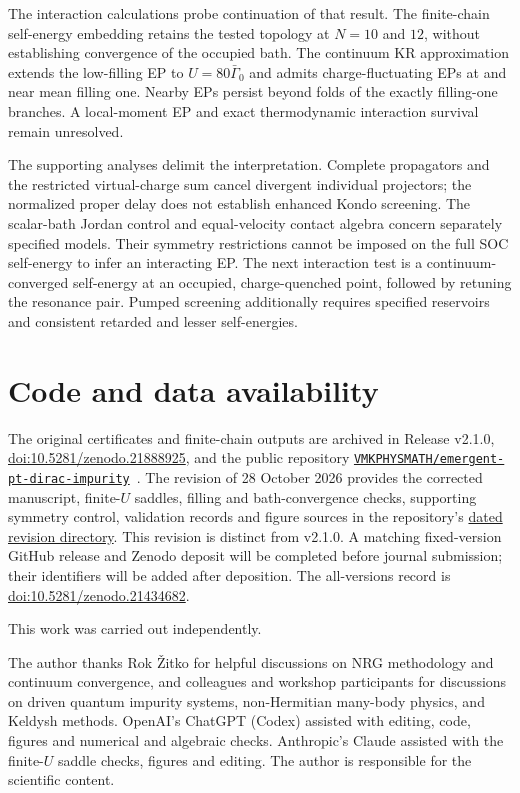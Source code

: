 \documentclass[%
  aps,physrev,onecolumn,10pt,amsmath,amssymb,superscriptaddress,longbibliography,floatfix
]{revtex4-2}
\begin{document}
The interaction calculations probe continuation of that result. The
finite-chain self-energy embedding retains the tested topology at $N=10$
and $12$, without establishing convergence of the occupied bath. The
continuum KR approximation extends the low-filling EP to
$U=80\bar\Gamma_0$ and admits charge-fluctuating EPs at and near mean
filling one. Nearby EPs persist beyond folds of the exactly filling-one
branches. A local-moment EP and exact thermodynamic interaction survival
remain unresolved.

The supporting analyses delimit the interpretation. Complete propagators
and the restricted virtual-charge sum cancel divergent individual
projectors; the normalized proper delay does not establish enhanced Kondo
screening. The scalar-bath Jordan control and equal-velocity contact
algebra concern separately specified models. Their symmetry restrictions
cannot be imposed on the full SOC self-energy to infer an interacting EP. The next interaction test is a continuum-converged
self-energy at an occupied, charge-quenched point, followed by retuning
the resonance pair. Pumped screening additionally requires specified
reservoirs and consistent retarded and lesser self-energies.

\section*{Code and data availability}
The original certificates and finite-chain outputs are archived in
Release v2.1.0, \href{https://doi.org/10.5281/zenodo.21888925}{doi:10.5281/zenodo.21888925},
and the public repository
\href{https://github.com/VMKPHYSMATH/emergent-pt-dirac-impurity}{\nolinkurl{VMKPHYSMATH/emergent-pt-dirac-impurity}}~\cite{kulkarni2026code}.
The revision of 28 October 2026 provides the corrected manuscript,
finite-$U$ saddles, filling and bath-convergence checks, supporting symmetry
control, validation records and figure sources in the repository's
\href{https://github.com/VMKPHYSMATH/emergent-pt-dirac-impurity/tree/revision/stationary-drive-20261028/revisions/20261028}{dated revision directory}.
This revision is distinct from v2.1.0. A matching fixed-version GitHub
release and Zenodo deposit will be completed before journal submission;
their identifiers will be added after deposition.
The all-versions record is
\href{https://doi.org/10.5281/zenodo.21434682}{doi:10.5281/zenodo.21434682}.

\begin{acknowledgments}
This work was carried out independently.

The author thanks Rok \v{Z}itko for helpful discussions on NRG methodology
and continuum convergence, and colleagues and workshop participants for
discussions on driven quantum impurity systems, non-Hermitian many-body
physics, and Keldysh methods.
OpenAI's ChatGPT (Codex) assisted with editing, code, figures and
numerical and algebraic checks. Anthropic's Claude assisted with the
finite-$U$ saddle checks, figures and editing. The author is responsible
for the scientific content.
\end{acknowledgments}
\end{document}
